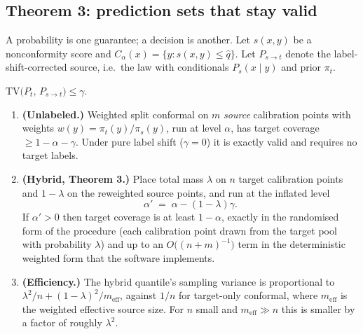 \subsection{Theorem 3: prediction sets that stay valid}

A probability is one guarantee; a decision is another.  Let $s(x,y)$ be a
nonconformity score and $C_\alpha(x)=\{y: s(x,y)\le\hat q\}$.  Let
$P_{s\to t}$ denote the label-shift-corrected source, i.e.\ the law with
conditionals $P_s(x\mid y)$ and prior $\pi_t$.

\begin{assumption}\label{ass:gamma}
$\mathrm{TV}\big(P_t,\,P_{s\to t}\big)\le\gamma$.
\end{assumption}

\begin{theorem}\label{thm:conformal}
\begin{enumerate}[label=(\alph*)]
\item \textbf{(Unlabeled.)}  Weighted split conformal on $m$ \emph{source}
calibration points with weights $w(y)=\pi_t(y)/\pi_s(y)$, run at level $\alpha$,
has target coverage $\ge 1-\alpha-\gamma$.  Under pure label shift
($\gamma=0$) it is exactly valid and requires no target labels.
\item \textbf{(Hybrid, Theorem 3.)}  Place total mass $\lambda$ on $n$ target
calibration points and $1-\lambda$ on the reweighted source points, and run at
the inflated level
\[
  \alpha' \;=\; \alpha-(1-\lambda)\gamma .
\]
If $\alpha'>0$ then target coverage is at least $1-\alpha$, exactly in the
randomised form of the procedure (each calibration point drawn from the target
pool with probability $\lambda$) and up to an $O\big((n+m)^{-1}\big)$ term in the
deterministic weighted form that the software implements.
\item \textbf{(Efficiency.)}  The hybrid quantile's sampling variance is
proportional to $\lambda^2/n + (1-\lambda)^2/m_{\mathrm{eff}}$, against $1/n$
for target-only conformal, where $m_{\mathrm{eff}}$ is the weighted effective
source size.  For $n$ small and $m_{\mathrm{eff}}\gg n$ this is smaller by a
factor of roughly $\lambda^{2}$.
\end{enumerate}
\end{theorem}

